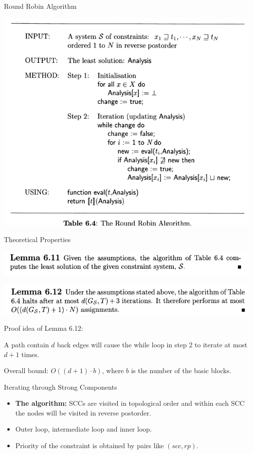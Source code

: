 \documentclass[aspectratio=1610, 13pt]{beamer}
\begin{document}
\begin{frame}{Round Robin Algorithm}
\begin{center}
\includegraphics[scale=0.35]{robin.png}
\end{center}
\end{frame}

\begin{frame}{Theoretical Properties}
\begin{center}
\includegraphics[scale=0.45]{lemma611.png}


\includegraphics[scale=0.45]{lemma612.png}
\end{center}

Proof idea of Lemma 6.12:

A path contain $d$ back edges will cause the while loop in step 2 to iterate at most $d + 1$ times.

Overall bound: $O((d + 1)\cdot b)$, where $b$ is the number of the basic blocks.


\end{frame}

\begin{frame}{Iterating through Strong Components}
\begin{itemize}
\item 
\textbf{The algorithm:} SCCs are visited in topological order and within each SCC the nodes will be visited in reverse postorder.
\item 
Outer loop, intermediate loop and inner loop.
\item 
Priority of the constraint is obtained by pairs like $(scc, rp)$.
\end{itemize}
\end{frame}
\end{document}
